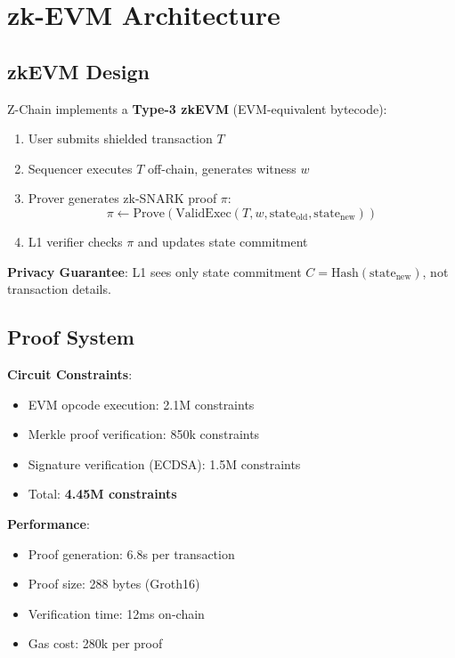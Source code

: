 \section{zk-EVM Architecture}


\subsection{zkEVM Design}

Z-Chain implements a \textbf{Type-3 zkEVM} (EVM-equivalent bytecode):

\begin{enumerate}
  \item User submits shielded transaction $T$
  \item Sequencer executes $T$ off-chain, generates witness $w$
  \item Prover generates zk-SNARK proof $\pi$:
  \begin{equation}
    \pi \leftarrow \text{Prove}\left(\text{ValidExec}(T, w, \text{state}_{\text{old}}, \text{state}_{\text{new}})\right)
  \end{equation}
  \item L1 verifier checks $\pi$ and updates state commitment
\end{enumerate}

\textbf{Privacy Guarantee}: L1 sees only state commitment $C = \text{Hash}(\text{state}_{\text{new}})$, not transaction details.

\subsection{Proof System}

\textbf{Circuit Constraints}:
\begin{itemize}[leftmargin=1.1em]
  \item EVM opcode execution: 2.1M constraints
  \item Merkle proof verification: 850k constraints
  \item Signature verification (ECDSA): 1.5M constraints
  \item Total: \textbf{4.45M constraints}
\end{itemize}

\textbf{Performance}:
\begin{itemize}[leftmargin=1.1em]
  \item Proof generation: 6.8s per transaction
  \item Proof size: 288 bytes (Groth16)
  \item Verification time: 12ms on-chain
  \item Gas cost: 280k per proof
\end{itemize}

